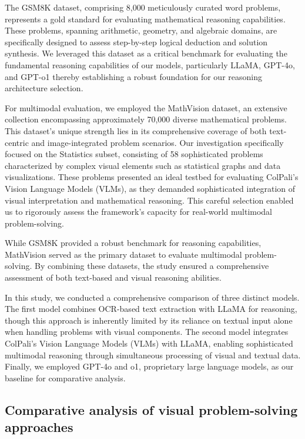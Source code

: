 \documentclass[a4paper,twoside,flushend, 10pt]{article}
\begin{document}
The GSM8K dataset, comprising 8,000 meticulously curated word problems, represents a gold standard for evaluating mathematical reasoning capabilities\cite{TDM2024}. These problems, spanning arithmetic, geometry, and algebraic domains, are specifically designed to assess step-by-step logical deduction and solution synthesis. We leveraged this dataset as a critical benchmark for evaluating the fundamental reasoning capabilities of our models, particularly LLaMA, GPT-4o, and GPT-o1 thereby establishing a robust foundation for our reasoning architecture selection.

For multimodal evaluation, we employed the MathVision dataset\cite{WPS2024}, an extensive collection encompassing approximately 70,000 diverse mathematical problems. This dataset's unique strength lies in its comprehensive coverage of both text-centric and image-integrated problem scenarios. Our investigation specifically focused on the Statistics subset, consisting of 58 sophisticated problems characterized by complex visual elements such as statistical graphs and data visualizations. These problems presented an ideal testbed for evaluating ColPali's Vision Language Models (VLMs), as they demanded sophisticated integration of visual interpretation and mathematical reasoning\cite{FSW2024}. This careful selection enabled us to rigorously assess the framework's capacity for real-world multimodal problem-solving.

While GSM8K provided a robust benchmark for reasoning capabilities, MathVision served as the primary dataset to evaluate multimodal problem-solving. By combining these datasets, the study ensured a comprehensive assessment of both text-based and visual reasoning abilities.

In this study, we conducted a comprehensive comparison of three distinct models. The first model combines OCR-based text extraction with LLaMA for reasoning, though this approach is inherently limited by its reliance on textual input alone when handling problems with visual components\cite{FSW2024}. The second model integrates ColPali's Vision Language Models (VLMs) with LLaMA, enabling sophisticated multimodal reasoning through simultaneous processing of visual and textual data\cite{FSW2024}. Finally, we employed GPT-4o and o1, proprietary large language models, as our baseline for comparative analysis\cite{WPS2024}.


\subsection{Comparative analysis of visual problem-solving approaches}
\noindent
\end{document}
